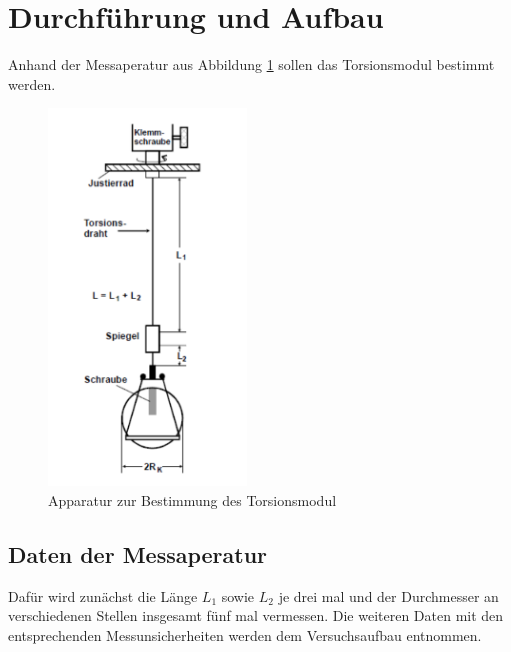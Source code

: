 \section{Durchführung und Aufbau}
\label{sec:Durchführung}
Anhand der Messaperatur aus Abbildung \ref{fig:Mess} sollen das Torsionsmodul bestimmt werden.
\begin{figure}
  \centering
  \includegraphics[height=10cm]{picture/Messapperatur.png}
  \caption{Apparatur zur Bestimmung des Torsionsmodul}
  \label{fig:Mess}
\end{figure}
\subsection{Daten der Messaperatur}
Dafür wird zunächst die Länge $L_1$ sowie $L_2$ je drei mal und der Durchmesser an verschiedenen Stellen insgesamt fünf mal vermessen. Die weiteren Daten mit den entsprechenden Messunsicherheiten werden dem Versuchsaufbau entnommen.
